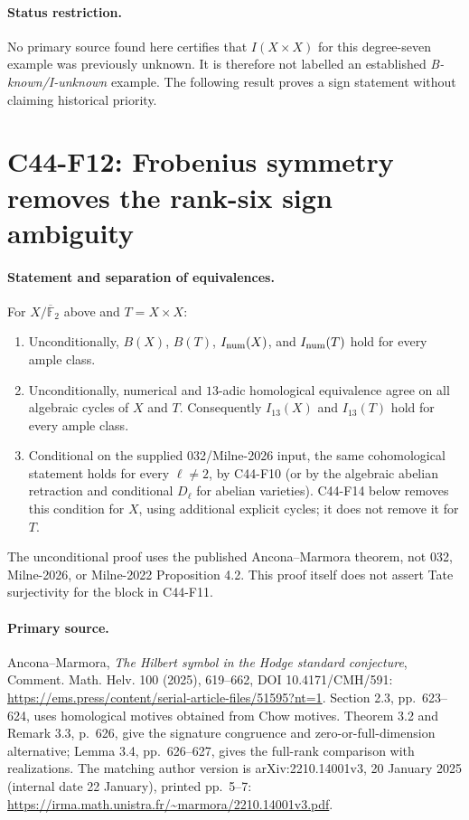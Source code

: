 \documentclass[11pt]{article}
\theoremstyle{remark}\newtheorem{remark}[theorem]{Remark}
\begin{document}
\paragraph{Status restriction.}
No primary source found here certifies that \(I(X\times X)\) for
this degree-seven example was previously unknown. It is therefore
not labelled an established \emph{B-known/I-unknown} example.
The following result proves a sign statement without claiming
historical priority.

\section{C44-F12: Frobenius symmetry removes the rank-six sign ambiguity}
\label{sec:C44-F12}
\paragraph{Statement and separation of equivalences.}
For \(X/\overline{\mathbb F}_2\) above and \(T=X\times X\):
\begin{enumerate}
\item Unconditionally, \(B(X)\), \(B(T)\), \(I_{\rm num}(X)\), and
\(I_{\rm num}(T)\) hold for every ample class.
\item Unconditionally, numerical and \(13\)-adic homological
equivalence agree on all algebraic cycles of \(X\) and \(T\).
Consequently \(I_{13}(X)\) and \(I_{13}(T)\) hold for every ample class.
\item Conditional on the supplied 032/Milne-2026 input, the same
cohomological statement holds for every \(\ell\ne2\), by C44-F10
(or by the algebraic abelian retraction and conditional \(D_\ell\)
for abelian varieties). C44-F14 below removes this condition for
\(X\), using additional explicit cycles; it does not remove it for \(T\).
\end{enumerate}
The unconditional proof uses the published Ancona--Marmora theorem,
not 032, Milne-2026, or Milne-2022 Proposition 4.2. This proof itself
does not assert Tate surjectivity for the block in C44-F11.

\paragraph{Primary source.}
Ancona--Marmora, \emph{The Hilbert symbol in the Hodge standard conjecture},
Comment. Math. Helv. 100 (2025), 619--662, DOI 10.4171/CMH/591:
\url{https://ems.press/content/serial-article-files/51595?nt=1}.
Section 2.3, pp.~623--624, uses homological motives obtained from
Chow motives. Theorem 3.2 and Remark 3.3, p.~626, give the signature
congruence and zero-or-full-dimension alternative; Lemma 3.4,
pp.~626--627, gives the full-rank comparison with realizations.
The matching author version is arXiv:2210.14001v3, 20 January 2025
(internal date 22 January), printed pp.~5--7:
\url{https://irma.math.unistra.fr/~marmora/2210.14001v3.pdf}.
\end{document}
